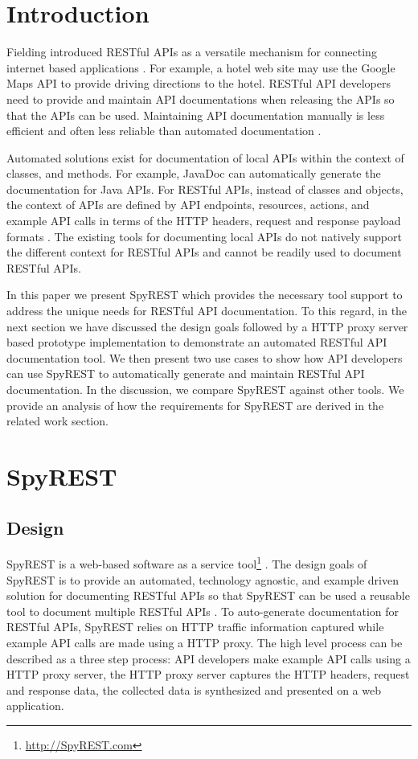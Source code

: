 \section{Introduction}
Fielding introduced RESTful APIs as a versatile mechanism for connecting internet based applications \cite{Fielding_rest}. For example, a hotel web site may use the Google Maps API to provide driving directions to the hotel. RESTful API developers need to provide and maintain API documentations when releasing the APIs so that the APIs can be used. Maintaining API documentation manually is less efficient and often less reliable than automated documentation \cite{Espinha_web}.

Automated solutions exist for documentation of local APIs within the context of classes, and methods. For example, JavaDoc can automatically generate the documentation for Java APIs. For RESTful APIs, instead of classes and objects, the context of APIs are defined by API endpoints, resources, actions, and example API calls in terms of the HTTP headers, request and response payload formats \cite{Danielsen_validation}. The existing tools for documenting local APIs do not natively support the different context for RESTful APIs and cannot be readily used to document RESTful APIs.

In this paper we present SpyREST which provides the necessary tool support to address the unique needs for RESTful API documentation. To this regard, in the next section we have discussed the design goals followed by a HTTP proxy server based prototype implementation to demonstrate an automated RESTful API documentation tool. We then present two use cases to show how API developers can use SpyREST to automatically generate and maintain RESTful API documentation. In the discussion, we compare SpyREST against other tools. We provide an analysis of how the requirements for SpyREST are derived in the related work section.

\section{SpyREST}

\subsection{Design} %
\label{sub:how_it_works}

SpyREST is a web-based software as a service tool\footnote{\url{http://SpyREST.com}} \cite{Sohan_spyrest}. The design goals of SpyREST is to provide an automated, technology agnostic, and example driven solution for documenting RESTful APIs so that SpyREST can be used a reusable tool to document multiple RESTful APIs . To auto-generate documentation for RESTful APIs, SpyREST relies on HTTP traffic information captured while example API calls are made using a HTTP proxy. The high level process can be described as a three step process: API developers make example API calls using a HTTP proxy server, the HTTP proxy server captures the HTTP headers, request and response data, the collected data is synthesized and presented on a web application.

